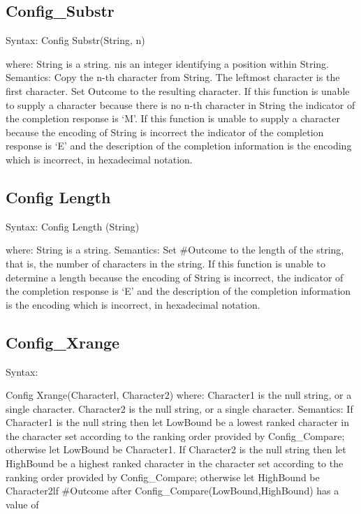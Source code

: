 \hypertarget{config_substr}{%
\subsection{Config\_Substr}\label{config_substr}}

Syntax: Config Substr(String, n)

where: String is a string. nis an integer identifying a position within
String. Semantics: Copy the n-th character from String. The leftmost
character is the first character. Set Outcome to the resulting
character. If this function is unable to supply a character because
there is no n-th character in String the indicator of the completion
response is `M'. If this function is unable to supply a character
because the encoding of String is incorrect the indicator of the
completion response is `E' and the description of the completion
information is the encoding which is incorrect, in hexadecimal notation.

\hypertarget{config-length}{%
\subsection{Config Length}\label{config-length}}

Syntax: Config Length (String)

where: String is a string. Semantics: Set \#Outcome to the length of the
string, that is, the number of characters in the string. If this
function is unable to determine a length because the encoding of String
is incorrect, the indicator of the completion response is `E' and the
description of the completion information is the encoding which is
incorrect, in hexadecimal notation.

\hypertarget{config_xrange}{%
\subsection{Config\_Xrange}\label{config_xrange}}

Syntax:

Config Xrange(Characterl, Character2) where: Character1 is the null
string, or a single character. Character2 is the null string, or a
single character. Semantics: If Character1 is the null string then let
LowBound be a lowest ranked character in the character set according to
the ranking order provided by Config\_Compare; otherwise let LowBound be
Character1. If Character2 is the null string then let HighBound be a
highest ranked character in the character set according to the ranking
order provided by Config\_Compare; otherwise let HighBound be
Character2lf \#Outcome after Config\_Compare(LowBound,HighBound) has a
value of

